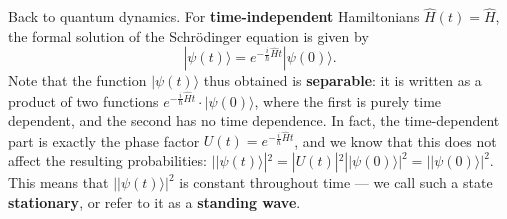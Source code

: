 \documentclass[fleqn]{article}
\begin{document}
Back to quantum dynamics.
For \textbf{time-independent} Hamiltonians \(\hat{H}(t)=\hat{H}\), the formal solution of the Schrödinger equation is given by
\[
  |\psi(t)\rangle
  = e^{-\frac{i}{\hbar}\hat{H}t}|\psi(0)\rangle.
\]
Note that the function \(|\psi(t)\rangle\) thus obtained is \textbf{separable}: it is written as a product of two functions \(e^{-\frac{i}{\hbar}\hat{H}t}\cdot|\psi(0)\rangle\), where the first is purely time dependent, and the second has no time dependence.
In fact, the time-dependent part is exactly the phase factor \(U(t)=e^{-\frac{i}{\hbar}\hat{H}t}\), and we know that this does not affect the resulting probabilities: \(||\psi(t)\rangle|^2=|U(t)|^2||\psi(0)\rangle|^2=||\psi(0)\rangle|^2\).
This means that \(||\psi(t)\rangle|^2\) is constant throughout time --- we call such a state \textbf{stationary}, or refer to it as a \textbf{standing wave}.
\end{document}
